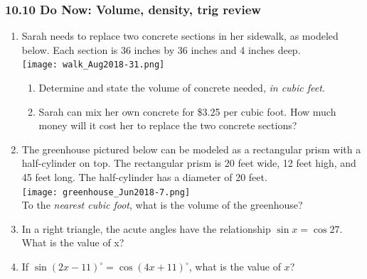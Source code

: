 \documentclass[12pt, twoside]{article}
\begin{document}
\subsubsection*{10.10 Do Now: Volume, density, trig review}
 \begin{enumerate}
    \item Sarah needs to replace two concrete sections in her sidewalk, as modeled below. Each section is 36 inches by 36 inches and 4 inches deep.\\[0.25cm]
    \texttt{[image: walk\_Aug2018-31.png]}
      \begin{enumerate}
        \item Determine and state the volume of concrete needed, \emph{in cubic feet}. \vspace{1.5cm}
        \item Sarah can mix her own concrete for \$3.25 per cubic foot. How much money will it cost her to replace the two concrete sections?
    \end{enumerate} \vspace{2.5cm}

    \item The greenhouse pictured below can be modeled as a rectangular prism with a half-cylinder on top. The rectangular prism is 20 feet wide, 12 feet high, and 45 feet long. The half-cylinder has a diameter of 20 feet.\\[0.5cm]
    \texttt{[image: greenhouse\_Jun2018-7.png]}\\
    To the \emph{nearest cubic foot}, what is the volume of the greenhouse?

\newpage
  \item In a right triangle, the acute angles have the relationship $\sin x=\cos 27$. What is the value of x? \vspace{2cm}

  \item If $\sin (2x-11)^\circ = \cos(4x+11)^\circ$, what is the value of $x$? \vspace{4cm}



\end{enumerate}
\end{document}
